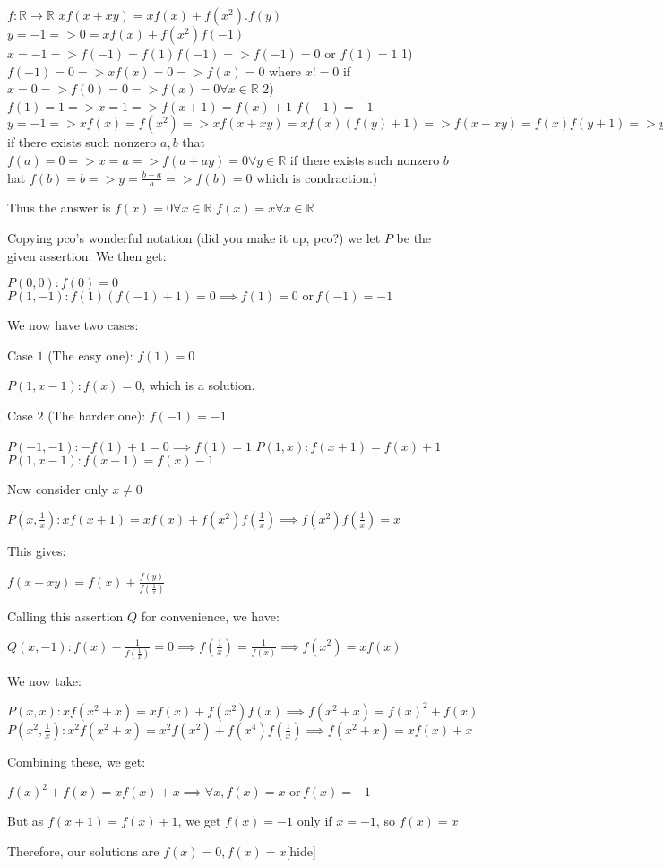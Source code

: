 \begin{solution}
	$ f:\mathbb{R}\rightarrow\mathbb{R} $
$ xf(x+xy)=xf(x)+f(x^{2}).f(y) $
$y=-1=>0=xf(x)+f(x^2)f(-1)$
$x=-1=>f(-1)=f(1)f(-1)=> f(-1)=0$ or $f(1)=1$
1) $f(-1)=0=>xf(x)=0=>f(x)=0$ where $x!=0$ if $x=0=>f(0)=0=>f(x)=0 \forall x\in\mathbb{R}$
2) $f(1)=1=>x=1=>f(x+1)=f(x)+1$
$f(-1)=-1$
$y=-1=>xf(x)=f(x^2)=>xf(x+xy)=xf(x)(f(y)+1)=>f(x+xy)=f(x)f(y+1)=>y=x-1=>f^2(x=f(x^2)=>xf(x)=f^2(x)=>f(x)(f(x)-x)=0$ if there exists such nonzero $a,b$ that $f(a)=0=>x=a=>f(a+ay)=0 \forall y\in\mathbb{R}$ if there exists such nonzero $b$ hat $f(b)=b=>y=\frac  {b-a} {a}=>f(b)=0$ which is condraction.)

Thus the answer is
$f(x)=0 \forall x \in\mathbb{R}$
$f(x)=x \forall x \in\mathbb{R}$
\end{solution}



\begin{solution}Copying pco's wonderful notation (did you make it up, pco?) we let $P$ be the given assertion. We then get:

$P(0,0): f(0)=0$
$P(1,-1): f(1)(f(-1)+1)=0\implies f(1)=0\,\, \text{or} \,f(-1)=-1$

We now have two cases:

Case $1$ (The easy one): $f(1)=0$

$P(1,x-1): f(x)=0$, which is a solution.

Case $2$ (The harder one): $f(-1)=-1$

$P(-1,-1): -f(1)+1=0\implies f(1)=1$
$P(1,x): f(x+1)=f(x)+1$
$P(1,x-1): f(x-1)=f(x)-1$

Now consider only $x\neq 0$

$P(x,\frac{1}{x}): xf(x+1)=xf(x)+f(x^2)f(\frac{1}{x})\implies f(x^2)f(\frac{1}{x})=x$

This gives:

$f(x+xy)=f(x)+\frac{f(y)}{f(\frac{1}{x})}$

Calling this assertion $Q$ for convenience, we have:

$Q(x,-1): f(x)-\frac{1}{f(\frac{1}{x})}=0\implies f(\frac{1}{x})=\frac{1}{f(x)}\implies f(x^2)=xf(x)$

We now take:

$P(x,x): xf(x^2+x)=xf(x)+f(x^2)f(x)\implies f(x^2+x)=f(x)^2+f(x)$
$P(x^2,\frac{1}{x}): x^2f(x^2+x)=x^2f(x^2)+f(x^4)f(\frac{1}{x})\implies f(x^2+x)=xf(x)+x$

Combining these, we get:

$f(x)^2+f(x)=xf(x)+x\implies \forall x, f(x)=x \,\,\text{or}\, f(x)=-1$

But as $f(x+1)=f(x)+1$, we get $f(x)=-1$ only if $x=-1$, so $f(x)=x$

Therefore, our solutions are $\boxed{f(x)=0, f(x)=x}$[\/hide]
\end{solution}



